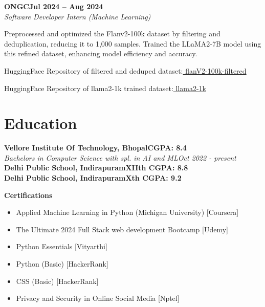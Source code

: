 \documentclass[letterpaper,10pt]{article}
\newcommand{\heading}[2]{
  \hspace{10pt}#1\hfill#2\\
}
\newcommand{\headingBf}[2]{
  \heading{\textbf{#1}}{\textbf{#2}}
}
\newcommand{\headingIt}[2]{
  \heading{\textit{#1}}{\textit{#2}}
}
\newenvironment{resume_list}{
  \vspace{-7pt}
  \begin{itemize}[itemsep=-2px, parsep=1pt, leftmargin=30pt]
}{
  \end{itemize}
}
\begin{document}
  \headingBf{ONGC}{Jul 2024 -- Aug 2024}
  \headingIt{Software Developer Intern (Machine Learning)}{}
  \begin{resume_list}
    \item Preprocessed and optimized the Flanv2-100k dataset by filtering and deduplication, reducing it to 1,000 samples. Trained the LLaMA2-7B model using this refined dataset, enhancing model efficiency and accuracy.
    \item HuggingFace Repository of filtered and deduped dataset:\href{https://huggingface.co/datasets/larrikin7/shaurya-flanV2-100k-filtered}{ flanV2-100k-filtered}
    \item HuggingFace Repository of llama2-1k trained dataset:\href{https://huggingface.co/datasets/larrikin7/shaurya-llama2-1k}{ llama2-1k}
  \end{resume_list}

  \section{Education}

  \headingBf{Vellore Institute Of Technology, Bhopal}{CGPA: 8.4} %
  \headingIt{Bachelors in Computer Science with spl. in AI and ML}{Oct 2022 - present}
  \headingBf{Delhi Public School, Indirapuram}{XIIth CGPA: 8.8}
  \headingBf{Delhi Public School, Indirapuram}{Xth CGPA: 9.2}


  \vspace{5pt}
  \headingBf{Certifications}{}
  \begin{multicols}{2}
    \begin{itemize}[itemsep=0px, parsep=1pt]
      \item Applied Machine Learning in Python (Michigan University) [Coursera]
      \item The Ultimate 2024 Full Stack web development Bootcamp [Udemy]
      \item Python Essentials [Vityarthi]
      \item Python (Basic) [HackerRank]
      \item CSS (Basic) [HackerRank]
      \item Privacy and Security in Online Social Media [Nptel]
    \end{itemize}
  \end{multicols}
\end{document}
